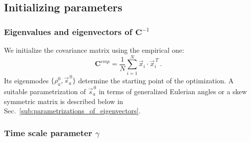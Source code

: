 \documentclass[preprint,amsmath,amssymb,superscriptaddress,showpacs,pre]{revtex4-1}
\let\originalleft\left
\let\originalright\right
\renewcommand{\left}{\mathopen{}\mathclose\bgroup\originalleft}
\renewcommand{\right}{\aftergroup\egroup\originalright}
\def\vx{\vec x}
\newcommand{\vsa}{\vec{s}_a}
\begin{document}

\subsection{Initializing parameters} %
\label{sub:initializing_parameters}

\subsubsection{Eigenvalues and eigenvectors of $\mathbf{C}^{-1}$}
\label{ssub:eigenvalues_and_eigenvectors}

We initialize the covariance matrix using the empirical one:
\begin{equation*}
	\mathbf{C}^{emp} = \frac{1}{N}\sum_{i=1}^{N}\vx_i \cdot\vx_i^{\,T}\ .
\end{equation*}
Its eigenmodes $\{\rho^0_a, \vsa^{\,0}\}$ determine the starting point of the optimization. A suitable parametrization of $\vsa^{\,0}$ in terms of generalized Eulerian angles or a skew symmetric matrix is described below in Sec.~\ref{sub:parametrizations_of_eigenvectors}.
	




\subsubsection{Time scale parameter $\gamma$}
\end{document}
